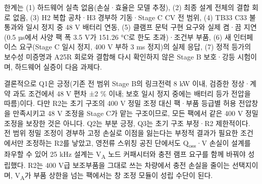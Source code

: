 한계는 (1) 하드웨어 실측 없음(손실·효율은 모델 추정), (2) 최종 설계 전체의 결합 회로 없음, (3) H2 복합 공차·H3 경부하 기동·Stage C CV 전 범위, (4) TB33 C33 불통과와 일시 정지 중 48 V 배터리 연동, (5) 클램프 문턱 구현 요구와 실제 켬·끔 지연(0.5 µs에서 사양 팩 폭 3.5 V가 151.26 °C로 한도 초과)·조건부 부품, (6) 새 인터페이스 요구(Stage C 일시 정지, 400 V 부하 3 ms 정지)의 실제 응답, (7) 정적 등가의 보수성 미증명과 A25R 회로와 결합해 다시 확인하지 않은 Stage B 보호·강등 시험이며, 하드웨어 실증이 다음 과제다.

결론적으로 Q1은 긍정(기존 전 범위 Stage B의 링크전력 8 kW 이내, 검증한 정상·계약 과도 조건에서 48 V 편차 ±2 \% 이내; 보호 일시 정지 중에는 배터리 등가 전압을 따름)이다. 다만 R2는 초기 구조의 400 V 정밀 조정 대신 팩·부품 등급별 허용 전압창을 만족시키고 48 V 조정을 Stage C가 맡는 구조이므로, 모든 팩에서 같은 400 V 정밀 조정을 보장한 것은 아니다. Q2는 부분 긍정, Q3는 초기 구조 부정·R2 제한적이다. 전 범위 정밀 조정이 경부하 고정 손실로 이점을 잃는다는 부정적 결과가 필요한 조건에서만 조정하는 R2를 낳았고, 영전류 스위칭 공진 단에서도 Q\textsubscript{oss}·V 손실이 설계를 좌우할 수 있어 25 kHz 설계는 V\textsubscript{A} 노드 커패시터와 충전 램프 요구를 함께 바꿔야 성립했다. R2는 400 V급 보조부품을 그대로 쓰는 차량에서 충전 손실을 줄이는 선택지이며, V\textsubscript{A}가 부품 상한을 넘는 팩에서는 창 조정 모듈이 성립 수단이 된다.
